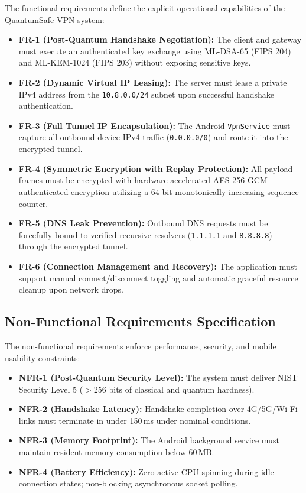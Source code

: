 The functional requirements define the explicit operational capabilities of the QuantumSafe VPN system:
\begin{itemize}[leftmargin=1.8em, itemsep=4pt]
    \item \textbf{FR-1 (Post-Quantum Handshake Negotiation):} The client and gateway must execute an authenticated key exchange using ML-DSA-65 (FIPS 204) and ML-KEM-1024 (FIPS 203) without exposing sensitive keys.
    \item \textbf{FR-2 (Dynamic Virtual IP Leasing):} The server must lease a private IPv4 address from the \texttt{10.8.0.0/24} subnet upon successful handshake authentication.
    \item \textbf{FR-3 (Full Tunnel IP Encapsulation):} The Android \texttt{VpnService} must capture all outbound device IPv4 traffic (\texttt{0.0.0.0/0}) and route it into the encrypted tunnel.
    \item \textbf{FR-4 (Symmetric Encryption with Replay Protection):} All payload frames must be encrypted with hardware-accelerated AES-256-GCM authenticated encryption utilizing a 64-bit monotonically increasing sequence counter.
    \item \textbf{FR-5 (DNS Leak Prevention):} Outbound DNS requests must be forcefully bound to verified recursive resolvers (\texttt{1.1.1.1} and \texttt{8.8.8.8}) through the encrypted tunnel.
    \item \textbf{FR-6 (Connection Management and Recovery):} The application must support manual connect/disconnect toggling and automatic graceful resource cleanup upon network drops.
\end{itemize}

\subsection{Non-Functional Requirements Specification}
\label{sec:non_functional_requirements}

The non-functional requirements enforce performance, security, and mobile usability constraints:
\begin{itemize}[leftmargin=1.8em, itemsep=4pt]
    \item \textbf{NFR-1 (Post-Quantum Security Level):} The system must deliver NIST Security Level 5 ($>256$ bits of classical and quantum hardness).
    \item \textbf{NFR-2 (Handshake Latency):} Handshake completion over 4G/5G/Wi-Fi links must terminate in under 150\,ms under nominal conditions.
    \item \textbf{NFR-3 (Memory Footprint):} The Android background service must maintain resident memory consumption below 60\,MB.
    \item \textbf{NFR-4 (Battery Efficiency):} Zero active CPU spinning during idle connection states; non-blocking asynchronous socket polling.
\end{itemize}

